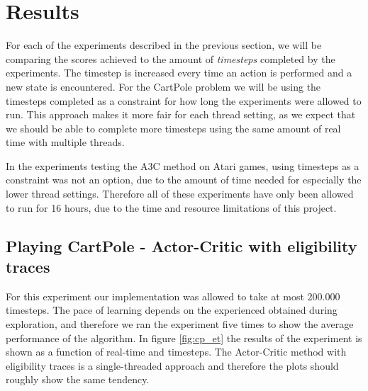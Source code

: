 \documentclass[11pt]{article}
\begin{document}
\section{Results}

For each of the experiments described in the previous section, we will be comparing the
scores achieved to the amount of \textit{timesteps} completed by the experiments.
The timestep is increased every time an action is performed and a new state is encountered.
For the CartPole problem we will be using the timesteps completed as a constraint for
how long the experiments were allowed to run.
This approach makes it more fair for each thread setting, as we expect 
that we should be able to complete more timesteps using the same amount of real time
with multiple threads.

In the experiments testing the A3C method on Atari games, using timesteps as a constraint
was not an option, due to the amount of time needed for especially the lower thread settings.
Therefore all of these experiments have only been allowed to run for 16 hours,
due to the time and resource limitations of this project.

\subsection{Playing CartPole - Actor-Critic with eligibility traces}

For this experiment our implementation was allowed to take at most 200.000 timesteps.
The pace of learning depends on the experienced obtained during exploration,
and therefore we ran the experiment five times to show the average performance of
the algorithm.
In figure \ref{fig:cp_et} the results of the experiment is shown
as a function of real-time and timesteps.
The Actor-Critic method with eligibility traces is a single-threaded
approach and therefore the plots should roughly show the same tendency.
\end{document}
